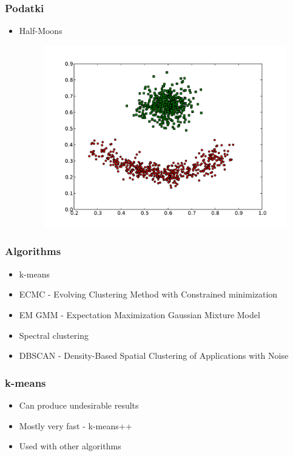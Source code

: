 \documentclass{beamer}
\begin{document}
\begin{frame}
\frametitle{Podatki}
    \begin{itemize}
   	\item Half-Moons
    		\begin{figure}[]
    			\includegraphics[scale=0.2]{red-blue-clusters.pdf}
    		\end{figure}
    \end{itemize}
\end{frame}

\begin{frame}
\frametitle{Algorithms}
    \begin{itemize}
   	\item k-means
    	\item ECMC - Evolving Clustering Method with Constrained minimization
   	\item EM GMM - Expectation Maximization Gaussian Mixture Model
   	\item Spectral clustering
   	\item DBSCAN - Density-Based Spatial Clustering of Applications with Noise
    \end{itemize}
\end{frame}



\begin{frame}
\frametitle{k-means}
    \begin{itemize}
   	\item Can produce undesirable results
   	\item Mostly very fast - k-means++
	\item Used with other algorithms
    \end{itemize}
\end{frame}
\end{document}
